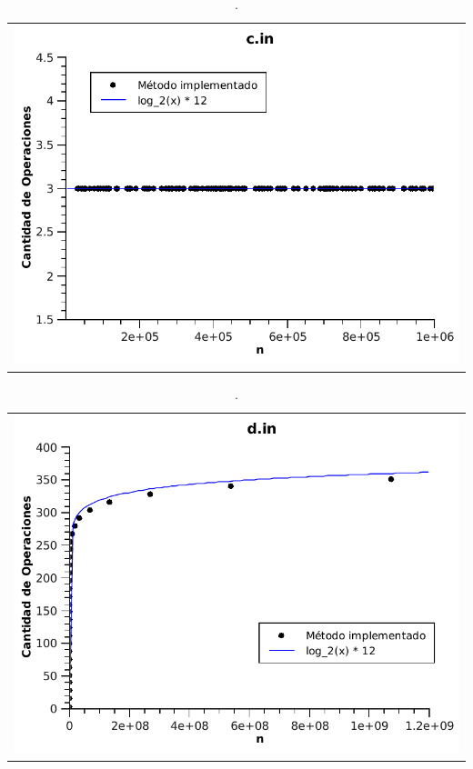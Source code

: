 	\begin{table}[ht]
		\centering 
			\begin{tabular}{c}
				\includegraphics[scale = 0.8]{./../ej1/tests/c.pdf}
			\end{tabular}
			\caption{.}
			\label{grafico3} 
	\end{table}

	\begin{table}[ht]
		\centering 
			\begin{tabular}{c}
				\includegraphics[scale = 0.8]{./../ej1/tests/d.pdf}
			\end{tabular}
			\caption{.} 
			\label{grafico4} 
	\end{table}

